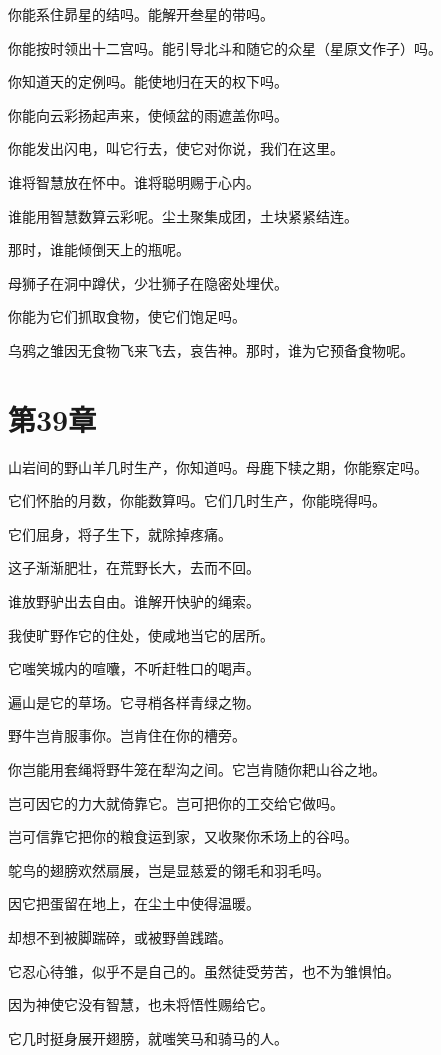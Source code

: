 \documentclass[12pt,oneside]{book}
\begin{document}
你能系住昴星的结吗。能解开叁星的带吗。

你能按时领出十二宫吗。能引导北斗和随它的众星（星原文作子）吗。

你知道天的定例吗。能使地归在天的权下吗。

你能向云彩扬起声来，使倾盆的雨遮盖你吗。

你能发出闪电，叫它行去，使它对你说，我们在这里。

谁将智慧放在怀中。谁将聪明赐于心内。

谁能用智慧数算云彩呢。尘土聚集成团，土块紧紧结连。

那时，谁能倾倒天上的瓶呢。

母狮子在洞中蹲伏，少壮狮子在隐密处埋伏。

你能为它们抓取食物，使它们饱足吗。

乌鸦之雏因无食物飞来飞去，哀告神。那时，谁为它预备食物呢。


\chapter{第39章}
山岩间的野山羊几时生产，你知道吗。母鹿下犊之期，你能察定吗。

它们怀胎的月数，你能数算吗。它们几时生产，你能晓得吗。

它们屈身，将子生下，就除掉疼痛。

这子渐渐肥壮，在荒野长大，去而不回。

谁放野驴出去自由。谁解开快驴的绳索。

我使旷野作它的住处，使咸地当它的居所。

它嗤笑城内的喧囔，不听赶牲口的喝声。

遍山是它的草场。它寻梢各样青绿之物。

野牛岂肯服事你。岂肯住在你的槽旁。

你岂能用套绳将野牛笼在犁沟之间。它岂肯随你耙山谷之地。

岂可因它的力大就倚靠它。岂可把你的工交给它做吗。

岂可信靠它把你的粮食运到家，又收聚你禾场上的谷吗。

鸵鸟的翅膀欢然扇展，岂是显慈爱的翎毛和羽毛吗。

因它把蛋留在地上，在尘土中使得温暖。

却想不到被脚踹碎，或被野兽践踏。

它忍心待雏，似乎不是自己的。虽然徒受劳苦，也不为雏惧怕。

因为神使它没有智慧，也未将悟性赐给它。

它几时挺身展开翅膀，就嗤笑马和骑马的人。
\end{document}
